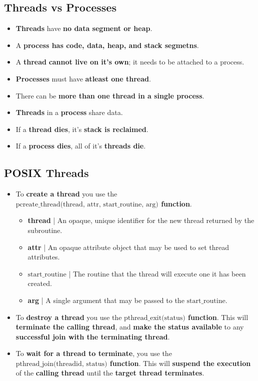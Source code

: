 \documentclass{article}
\begin{document}
\subsection*{Threads vs Processes}
\begin{itemize}
    \item \textbf{Threads} have \textbf{no data segment or heap}.
    \item A \textbf{process has code, data, heap, and stack segmetns}.
    \item A \textbf{thread} \textbf{cannot live on it's own}; it needs to be attached to a process.
    \item \textbf{Processes} must have \textbf{atleast one thread}.
    \item There can be \textbf{more than one thread in a single process}.
    \item \textbf{Threads} in a \textbf{process} share data.
    \item If a \textbf{thread dies}, it's \textbf{stack is reclaimed}.
    \item If a \textbf{process dies}, all of it's \textbf{threads die}.
\end{itemize}

\subsection*{POSIX Threads}
\begin{itemize}
    \item To \textbf{create a thread} you use the \textbf{$\text{pcreate\_thread(thread, attr, start\_routine, arg)}$ function}.
    \begin{itemize}
        \item \textbf{thread} | An opaque, unique identifier for the new thread returned by the subroutine.
        \item \textbf{attr} | An opaque attribute object that may be used to set thread attributes.
        \item \textbf{$\text{start\_routine}$} | The routine that the thread will execute one it has been created.
        \item \textbf{arg} | A single argument that may be passed to the \textbf{$\text{start\_routine}$}.
    \end{itemize}
    \item To \textbf{destroy a thread} you use the \textbf{$\text{pthread\_exit(status)}$ function}. This will \textbf{terminate the calling thread}, and \textbf{make the status available} to any \textbf{successful join with the terminating thread}.
    \item To \textbf{wait for a thread to terminate}, you use the \textbf{$\text{pthread\_join(threadid, status)}$ function}. This will \textbf{suspend the execution} of the \textbf{calling thread} until the \textbf{target thread terminates}.
\end{itemize}
\end{document}
